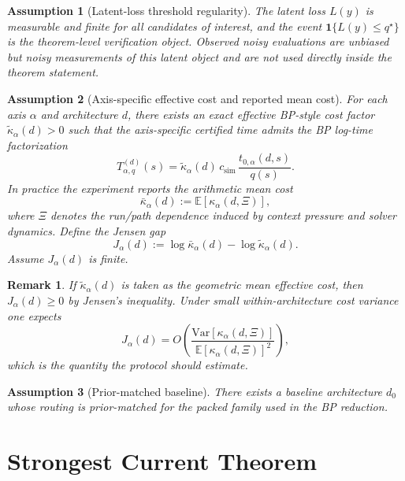 \documentclass[11pt]{article}
\newtheorem{assumption}{Assumption}
\newtheorem{remark}{Remark}
\begin{document}
\begin{assumption}[Latent-loss threshold regularity]
The latent loss $L(y)$ is measurable and finite for all candidates of interest, and the event
$\mathbf{1}\{L(y)\le q^\star\}$ is the theorem-level verification object.
Observed noisy evaluations are unbiased but noisy measurements of this latent object and are not
used directly inside the theorem statement.
\end{assumption}

\begin{assumption}[Axis-specific effective cost and reported mean cost]
For each axis $\alpha$ and architecture $d$, there exists an exact effective BP-style cost factor
$\tilde\kappa_\alpha(d) > 0$ such that the axis-specific certified time admits the BP log-time
factorization
\[
T_{\alpha,q}^{(d)}(s)
=
\tilde\kappa_\alpha(d)\, c_{\mathrm{sim}}\, \frac{t_{0,\alpha}(d,s)}{q(s)}.
\]
In practice the experiment reports the arithmetic mean cost
\[
\bar\kappa_\alpha(d) := \mathbb{E}[\kappa_\alpha(d,\Xi)],
\]
where $\Xi$ denotes the run/path dependence induced by context pressure and solver dynamics.
Define the Jensen gap
\[
J_\alpha(d) := \log \bar\kappa_\alpha(d) - \log \tilde\kappa_\alpha(d).
\]
Assume $J_\alpha(d)$ is finite.
\end{assumption}

\begin{remark}
If $\tilde\kappa_\alpha(d)$ is taken as the geometric mean effective cost, then $J_\alpha(d)\ge 0$
by Jensen's inequality. Under small within-architecture cost variance one expects
\[
J_\alpha(d)=O\!\left(\frac{\mathrm{Var}[\kappa_\alpha(d,\Xi)]}{\mathbb{E}[\kappa_\alpha(d,\Xi)]^2}\right),
\]
which is the quantity the protocol should estimate.
\end{remark}

\begin{assumption}[Prior-matched baseline]
There exists a baseline architecture $d_0$ whose routing is prior-matched for the packed family
used in the BP reduction.
\end{assumption}

\section{Strongest Current Theorem}
\end{document}
